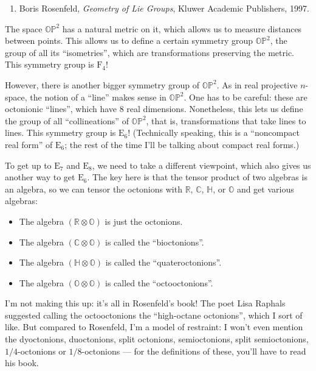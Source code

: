 \documentclass{article}
\def\tightlist{}
\begin{document}
\begin{enumerate}
\def\labelenumi{\arabic{enumi})}
\tightlist
\item
  Boris Rosenfeld, \emph{Geometry of Lie Groups}, Kluwer Academic
  Publishers, 1997.
\end{enumerate}

The space \(\mathbb{OP}^2\) has a natural metric on it, which allows us
to measure distances between points. This allows us to define a certain
symmetry group \(\mathbb{OP}^2\), the group of all its ``isometries'',
which are transformations preserving the metric. This symmetry group is
\(\mathrm{F}_4\)!

However, there is another bigger symmetry group of \(\mathbb{OP}^2\). As
in real projective \(n\)-space, the notion of a ``line'' makes sense in
\(\mathbb{OP}^2\). One has to be careful: these are octonionic
``lines'', which have 8 real dimensions. Nonetheless, this lets us
define the group of all ``collineations'' of \(\mathbb{OP}^2\), that is,
transformations that take lines to lines. This symmetry group is
\(\mathrm{E}_6\)! (Technically speaking, this is a ``noncompact real
form'' of \(\mathrm{E}_6\); the rest of the time I'll be talking about
compact real forms.)

To get up to \(\mathrm{E}_7\) and \(\mathrm{E}_8\), we need to take a
different viewpoint, which also gives us another way to get
\(\mathrm{E}_6\). The key here is that the tensor product of two
algebras is an algebra, so we can tensor the octonions with
\(\mathbb{R}\), \(\mathbb{C}\), \(\mathbb{H}\), or \(\mathbb{O}\) and
get various algebras:

\begin{itemize}
\tightlist
\item
  The algebra \((\mathbb{R}\otimes\mathbb{O})\) is just the octonions.
\item
  The algebra \((\mathbb{C}\otimes\mathbb{O})\) is called the
  ``bioctonions''.
\item
  The algebra \((\mathbb{H}\otimes\mathbb{O})\) is called the
  ``quateroctonions''.
\item
  The algebra \((\mathbb{O}\otimes\mathbb{O})\) is called the
  ``octooctonions''.
\end{itemize}

I'm not making this up: it's all in Rosenfeld's book! The poet Lisa
Raphals suggested calling the octooctonions the ``high-octane
octonions'', which I sort of like. But compared to Rosenfeld, I'm a
model of restraint: I won't even mention the dyoctonions, duoctonions,
split octonions, semioctonions, split semioctonions, \(1/4\)-octonions
or \(1/8\)-octonions --- for the definitions of these, you'll have to
read his book.
\end{document}
